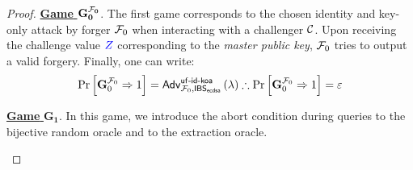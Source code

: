 \documentclass[version=submission, floatrow]{iacrcc}
\begin{document}
\begin{proof}
\noindent\underline{\textbf{Game} $\mathbf{G_{0}^{\mathcal{F}_{0}}}$}. The first game corresponds to the chosen identity and key-only attack by forger $\mathcal{F}_{0}$ when interacting with a challenger $\mathcal{C}$. Upon receiving the challenge value $\textcolor{blue}{Z}$ corresponding to the \emph{master public key}, $\mathcal{F}_{0}$ tries to output a valid forgery. Finally, one can write:\[
    \mathrm{Pr}\left[\mathbf{G}_{0}^{\mathcal{F}_{0}} \Rightarrow 1\right] = \mathsf{Adv}_{\mathcal{F}_{0}, \mathsf{IBS}_{\mathsf{ecdsa}}}^{\mathsf{uf}\text{-}\mathsf{id}\text{-}\mathsf{koa}}\left(\lambda\right) \therefore \mathrm{Pr}\left[\mathbf{G}_{0}^{\mathcal{F}_{0}} \Rightarrow 1\right] = \varepsilon
\]

\noindent\underline{\textbf{Game} $\mathbf{G_{1}}$}. In this game, we introduce the abort condition during queries to the bijective random oracle and to the extraction oracle.
%
\begin{figure}[H]
\centering
\begin{pchstack}[center, boxed, space=1em]
\begin{pcvstack}
\end{pcvstack}
\end{pchstack}
\end{figure}
\end{proof}
\end{document}
